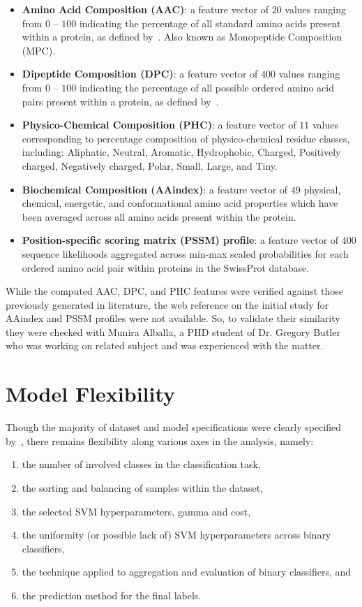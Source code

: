 \begin{itemize}
\item \textbf{Amino Acid Composition (AAC)}: a feature vector of $20$ values ranging from $0$ -- $100$ indicating the
percentage of all standard amino acids present within a protein, as defined by~\cite{gromiha2010protein}. Also known
as Monopeptide Composition (MPC).
\item \textbf{Dipeptide Composition (DPC)}: a feature vector of $400$ values ranging from $0$ -- $100$ indicating the
percentage of all possible ordered amino acid pairs present within a protein, as defined by~\cite{gromiha2010protein}.
\item \textbf{Physico-Chemical Composition (PHC)}: a feature vector of $11$ values corresponding
to percentage composition of physico-chemical residue classes, including: Aliphatic, Neutral, Aromatic, Hydrophobic, Charged, Positively charged,
Negatively charged, Polar, Small, Large, and Tiny. 
\item \textbf{Biochemical Composition (AAindex)}: a feature vector of $49$ physical, chemical, energetic, and
conformational amino acid properties which have been averaged across all amino acids present within the protein.
\item \textbf{Position-specific scoring matrix (PSSM) profile}: a feature vector of $400$ sequence
likelihoods aggregated across min-max scaled probabilities for each ordered amino acid pair within
proteins in the SwissProt database.
\end{itemize}

While the computed AAC, DPC, and PHC features were verified against those previously generated in literature, the 
web reference on the initial study for AAindex and PSSM profiles were not available. So, to validate their similarity 
they were checked with Munira Alballa, a PHD student of Dr. Gregory Butler who was working on related subject \cite{alballa2020trancep}
and was experienced with the matter.


\section{Model Flexibility}
\label{sec:modelflex}
Though the majority of dataset and model specifications were clearly specified by~\cite{mishra_prediction_2014}, there
remains flexibility along various axes in the analysis, namely:

\begin{enumerate}
\item the number of involved classes in the classification task,
\item the sorting and balancing of samples within the dataset,
\item the selected SVM hyperparameters, gamma and cost,
\item the uniformity (or possible lack of) SVM hyperparameters across binary classifiers,
\item the technique applied to aggregation and evaluation of binary classifiers, and
\item the prediction method for the final labels.
\end{enumerate}

